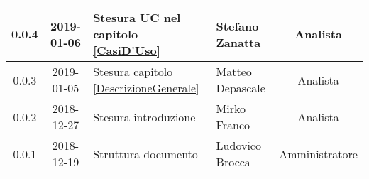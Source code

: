 \begin{center}
\begin{tabularx}{\textwidth}{|c|c|X|X|c|}
			\hline
			0.0.4 & 2019-01-06 & Stesura UC nel capitolo \ref{CasiD'Uso}& Stefano Zanatta & Analista\\
			\hline
			0.0.3 & 2019-01-05 & Stesura capitolo \ref{DescrizioneGenerale}& Matteo Depascale & Analista\\
			\hline
			0.0.2 & 2018-12-27 & Stesura introduzione & Mirko Franco & Analista\\
			\hline
			0.0.1 & 2018-12-19 & Struttura documento & Ludovico Brocca & Amministratore\\
			\hline
		\end{tabularx}
	\end{center}
\newpage